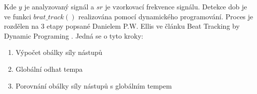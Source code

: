     Kde $ y $ je analyzovaný signál a $ sr $ je vzorkovací frekvence signálu.
    Detekce dob je ve funkci $ brat\_track() $ realizována pomocí dynamického programování. Proces je rozdělen na 3 etapy popsané Danielem P.W. Ellis ve článku Beat Tracking by Dynamic Programing \cite{Beat_tracking_by_dynamic_programing}. Jedná se o tyto kroky:

    \smallskip

    \begin{enumerate}
      \item Výpočet obálky síly nástupů
      \item Globální odhat tempa
      \item Porovnání obálky síly nástupů s globálním tempem
    \end{enumerate}

    \smallskip

